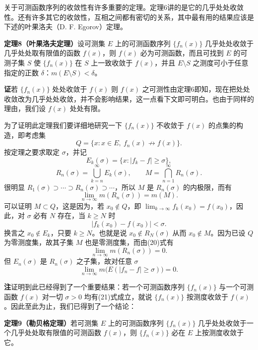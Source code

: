 关于可测函数序列的收敛性有许多重要的定理。定理6讲的是它的几乎处处收敛性。还有许多其它的收敛性，互相之间都有密切的关系，其中最有用的结果应该是下述的叶果洛夫（D. F. Egorov）定理。

\noindent\textbf{定理8（叶果洛夫定理）}\quad 设可测集 $E$ 上的可测函数序列 $\{f_n(x)\}$ 几乎处处收敛于几乎处处取有限值的函数 $f(x)$，则 $f(x)$ 必为可测函数，而且可找到 $E$ 的可测子集 $S$ 使 $\{f_n(x)\}$ 在 $S$ 上一致收敛于 $f(x)$，并且 $E\setminus S$ 之测度可小于任意指定的正数 $\delta$：$m(E\setminus S)<\delta$。

\noindent\textbf{证}\quad 若 $\{f_n(x)\}$ 处处收敛于 $f(x)$ 则 $f(x)$ 之可测性由定理6即知，现在把处处收敛改为几乎处处收敛，并不会影响结果，这一点看下文即可明白。也由于同样的理由，我们设 $f(x)$ 处处有限。

为了证明此定理我们要详细地研究一下 $\{f_n(x)\}$ 不收敛于 $f(x)$ 的点集的构造，即考虑集
\begin{equation}
 Q=\{x:x\in E,\ f_n(x)\not\to f(x)\}.
 \tag{19}
\end{equation}
按定理之要求取定 $\sigma$，并记
\[
 E_k(\sigma)=\{x:|f_k-f|\ge\sigma\},
\]
\[
 R_n(\sigma)=\bigcup_{k=n}^{\infty}E_k(\sigma),
 \qquad
 M=\bigcap_{n=1}^{\infty}R_n(\sigma).
\]
很明显 $R_1(\sigma)\supset\cdots\supset R_n(\sigma)\supset\cdots$，所以 $M$ 是 $R_n(\sigma)$ 的内极限，而有
\begin{equation}
 \lim_{n\to\infty}m(R_n(\sigma))=m(M).
 \tag{20}
\end{equation}
可以证明 $M\subset Q$，这是因为，若 $x_0\notin Q$，即 $\lim_{k\to\infty}f_k(x_0)=f(x_0)$，因此，对 $\sigma$ 必有 $N$ 存在，当 $k\ge N$ 时
\[
 |f_k(x_0)-f(x_0)|<\sigma.
\]
换言之 $x_0\notin E_k$，只要 $k\ge N$。也就是说 $x_0\notin R_N(\sigma)$ 从而 $x_0\notin M$。因为已设 $Q$ 为零测度集，故其子集 $M$ 也是零测度集，而由(20)式有
\[
 \lim_{n\to\infty}m(R_n(\sigma))=0.
\]
但 $E_n(\sigma)$ 是 $R_n(\sigma)$ 之子集，故对任意 $\sigma$
\begin{equation}
 \lim_{n\to\infty}m\big(E(|f_n-f|\ge\sigma)\big)=0.
 \tag{21}
\end{equation}

\noindent\textbf{注}\quad 证明到此已经得到了一个重要结果：若一个可测函数序列 $\{f_n(x)\}$ 与一个可测函数 $f(x)$ 对一切 $\sigma>0$ 均有(21)式成立，就说 $\{f_n(x)\}$ 按测度收敛于 $f(x)$。因此至此为止，我们已得到了一个结论：

\noindent\textbf{定理9（勒贝格定理）}\quad 若可测集 $E$ 上的可测函数序列 $\{f_n(x)\}$ 几乎处处收敛于一个几乎处处取有限值的可测函数 $f(x)$，则 $\{f_n(x)\}$ 必在 $E$ 上按测度收敛于它。

